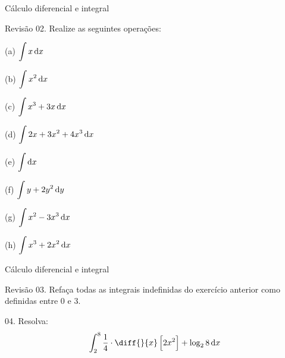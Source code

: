 \begin{frame}{Cálculo diferencial e integral}
	\begin{block}{Revisão}
		02. Realize as seguintes operações:
		
		\smallskip
		
		\begin{minipage}{0.49\linewidth}
			(a) $ \displaystyle\int x \dif x $
			
			\vspace{0.5cm}
			
			(b) $ \displaystyle\int x^{2} \dif x $
			
			\vspace{0.5cm}
			
			(c) $ \displaystyle\int x^{3}+3x \dif x $
			
			\vspace{0.5cm}
			
			(d) $ \displaystyle\int 2x+3x^{2}+4x^{3}\dif x $
		\end{minipage}
		\hfill
		\begin{minipage}{0.49\linewidth}
			(e) $ \displaystyle\int \dif x $
			
			\vspace{0.5cm}
			
			(f) $ \displaystyle\int y+2y^{2} \dif y $
			
			\vspace{0.5cm}
			
			(g) $ \displaystyle\int x^{2}-3x^{3} \dif x $
			
			\vspace{0.5cm}
			
			(h) $ \displaystyle\int x^{3}+2x^{2} \dif x $
		\end{minipage}
	\end{block}
\end{frame}


\begin{frame}{Cálculo diferencial e integral}
	\begin{block}{Revisão}
		03. Refaça todas as integrais indefinidas do exercício anterior como definidas entre $ 0 $ e $ 3 $.
		
		\vspace{1cm}
		
		04. Resolva: \[ \int_{2}^{8} \dfrac{1}{4}\cdot\diff{}{x}\sbr{2x^{2}} + \log_2 8 \dif x \]
	\end{block}
\end{frame}


